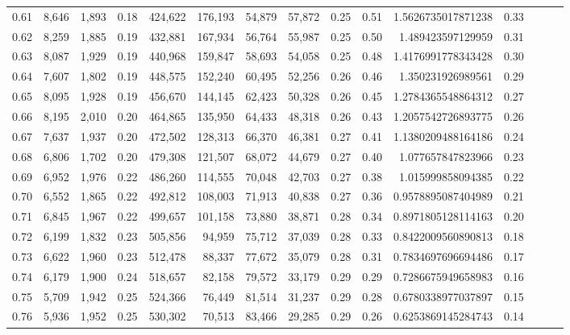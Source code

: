 \begin{tabular}{rrrrrrrrrrrrrrr}
0.61 &   8,646 &  1,893 &  0.18 &  424,622 &  176,193 &   54,879 &   57,872 &  0.25 &  0.51 &    1.5626735017871238 &      0.33 \\
0.62 &   8,259 &  1,885 &  0.19 &  432,881 &  167,934 &   56,764 &   55,987 &  0.25 &  0.50 &     1.489423597129959 &      0.31 \\
0.63 &   8,087 &  1,929 &  0.19 &  440,968 &  159,847 &   58,693 &   54,058 &  0.25 &  0.48 &    1.4176991778343428 &      0.30 \\
0.64 &   7,607 &  1,802 &  0.19 &  448,575 &  152,240 &   60,495 &   52,256 &  0.26 &  0.46 &     1.350231926989561 &      0.29 \\
0.65 &   8,095 &  1,928 &  0.19 &  456,670 &  144,145 &   62,423 &   50,328 &  0.26 &  0.45 &    1.2784365548864312 &      0.27 \\
0.66 &   8,195 &  2,010 &  0.20 &  464,865 &  135,950 &   64,433 &   48,318 &  0.26 &  0.43 &    1.2057542726893775 &      0.26 \\
0.67 &   7,637 &  1,937 &  0.20 &  472,502 &  128,313 &   66,370 &   46,381 &  0.27 &  0.41 &    1.1380209488164186 &      0.24 \\
0.68 &   6,806 &  1,702 &  0.20 &  479,308 &  121,507 &   68,072 &   44,679 &  0.27 &  0.40 &     1.077657847823966 &      0.23 \\
0.69 &   6,952 &  1,976 &  0.22 &  486,260 &  114,555 &   70,048 &   42,703 &  0.27 &  0.38 &     1.015999858094385 &      0.22 \\
0.70 &   6,552 &  1,865 &  0.22 &  492,812 &  108,003 &   71,913 &   40,838 &  0.27 &  0.36 &    0.9578895087404989 &      0.21 \\
0.71 &   6,845 &  1,967 &  0.22 &  499,657 &  101,158 &   73,880 &   38,871 &  0.28 &  0.34 &    0.8971805128114163 &      0.20 \\
0.72 &   6,199 &  1,832 &  0.23 &  505,856 &   94,959 &   75,712 &   37,039 &  0.28 &  0.33 &    0.8422009560890813 &      0.18 \\
0.73 &   6,622 &  1,960 &  0.23 &  512,478 &   88,337 &   77,672 &   35,079 &  0.28 &  0.31 &    0.7834697696694486 &      0.17 \\
0.74 &   6,179 &  1,900 &  0.24 &  518,657 &   82,158 &   79,572 &   33,179 &  0.29 &  0.29 &    0.7286675949658983 &      0.16 \\
0.75 &   5,709 &  1,942 &  0.25 &  524,366 &   76,449 &   81,514 &   31,237 &  0.29 &  0.28 &    0.6780338977037897 &      0.15 \\
0.76 &   5,936 &  1,952 &  0.25 &  530,302 &   70,513 &   83,466 &   29,285 &  0.29 &  0.26 &    0.6253869145284743 &      0.14 \\

\end{tabular}
